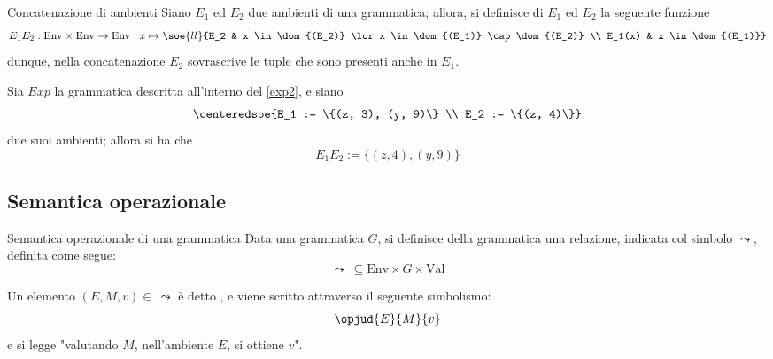\documentclass[a4paper, 12pt]{report}
\begin{document}
    \begin{frameddefn}{Concatenazione di ambienti}
        Siano $E_1$ ed $E_2$ due ambienti di una grammatica; allora, si definisce  di $E_1$ ed $E_2$ la seguente funzione $$E_1E_2: \mathrm{Env} \times \mathrm{Env} \to \mathrm{Env} : x \mapsto \soe{ll}{E_2 & x \in \dom{(E_2)} \lor x \in \dom{(E_1)} \cap \dom{(E_2)} \\ E_1(x) & x \in \dom{(E_1)}}$$ dunque, nella concatenazione $E_2$ sovrascrive le tuple che sono presenti anche in $E_1$.
    \end{frameddefn}

    \begin{example}
        Sia $Exp$ la grammatica descritta all'interno del \cref{exp2}, e siano $$\centeredsoe{E_1 := \{(z, 3), (y, 9)\} \\ E_2 := \{(z, 4)\}}$$ due suoi ambienti; allora si ha che $$E_1E_2 := \{(z, 4), (y, 9)\}$$
    \end{example}

    \subsection{Semantica operazionale}

    \begin{frameddefn}[label={sem opexp}]{Semantica operazionale di una grammatica}
        Data una grammatica $G$, si definisce  della grammatica una relazione, indicata col simbolo $\leadsto$, definita come segue: $$\leadsto \ \subseteq \mathrm{Env} \times G \times \mathrm{Val}$$

        Un elemento $(E, M, v) \in \ \leadsto$ è detto , e viene scritto attraverso il seguente simbolismo: $$\opjud{E}{M}{v}$$ e si legge "valutando $M$, nell'ambiente $E$, si ottiene $v$".
    \end{frameddefn}
\end{document}
